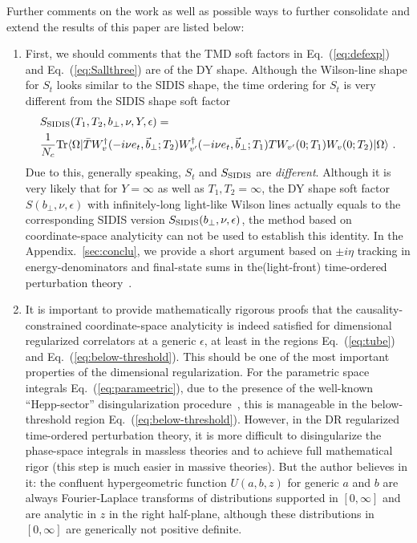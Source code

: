 \documentclass[a4paper,11pt]{article}
\begin{document}
Further comments on the work as well as possible ways to further consolidate and extend the results of this paper are listed below: 
\begin{enumerate}
\item First, we should comments that the TMD soft factors in Eq.~(\ref{eq:defexp}) and Eq.~(\ref{eq:Sallthree}) are of the DY shape. Although the Wilson-line shape for $S_t$ looks similar to the SIDIS shape, the time ordering for $S_t$ is very different from the SIDIS shape soft factor
\begin{align}\label{eq:SSIDIS}
&S_{\rm SIDIS}(T_1,T_2,b_\perp,\nu,Y,\epsilon)=\nonumber \\
&\frac{1}{N_c}{\rm Tr}\langle \Omega|\bar T W^{\dagger}_{v}(-i\nu e_t, \vec{b}_\perp;T_2)W^{\dagger}_{v'}(-i\nu e_t,\vec{b}_\perp;T_1) TW_{v'}(0;T_1)W_{v}(0;T_2)|\Omega \rangle \ .
\end{align}
Due to this, generally speaking, $S_t$ and $S_{\rm SIDIS}$ are {\it different}. Although it is very likely that for $Y= \infty$ as well as $T_1,T_2=\infty$,  the DY shape soft factor $S(b_\perp, \nu, \epsilon)$ with infinitely-long light-like Wilson lines actually equals to the corresponding SIDIS version $S_{\rm SIDIS}(b_\perp,\nu,\epsilon)$, the method based on coordinate-space analyticity can not be used to establish this identity. In the Appendix.~\ref{sec:conclu}, we provide a short argument based on $\pm i\eta$ tracking in energy-denominators and final-state sums in the(light-front) time-ordered perturbation theory~\cite{Collins:2011zzd}.
    \item It is important to provide mathematically rigorous proofs that the causality-constrained coordinate-space analyticity is indeed satisfied for dimensional regularized correlators at a generic $\epsilon$, at least in the regions Eq.~(\ref{eq:tube}) and Eq.~(\ref{eq:below-threshold}).  This should be one of the most important properties of the dimensional regularization.  For the parametric space integrals Eq.~(\ref{eq:parameetric}), due to the presence of the well-known ``Hepp-sector'' disingularization procedure~\cite{Hepp:1966eg}, this is manageable in the below-threshold region Eq.~(\ref{eq:below-threshold}).  However, in the DR regularized time-ordered perturbation theory, it is more difficult to disingularize the phase-space integrals in massless theories and to achieve full mathematical rigor (this step is much easier in massive theories).  But the author believes in it: the confluent hypergeometric function $U(a,b,z)$ for generic $a$ and $b$ are always Fourier-Laplace transforms of distributions supported in $[0,\infty]$ and are analytic in $z$ in the right half-plane, although these distributions in $[0,\infty]$ are generically not positive definite.  

\end{enumerate}
\end{document}
